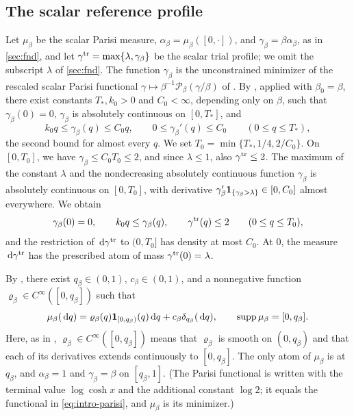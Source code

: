 \subsection{The scalar reference profile}
Let $\mu_\beta$ be the scalar Parisi measure, $\alpha_\beta=\mu_\beta([0,\cdot])$,
and $\gamma_\beta=\beta\alpha_\beta$, as in \cref{sec:fnd}, and let
$\gamma^{\rm tr}=\max\{\lambda,\gamma_\beta\}$ be the scalar trial profile; we
omit the subscript $\lambda$ of \cref{sec:fnd}. The function $\gamma_\beta$ is
the unconstrained minimizer of the rescaled scalar Parisi functional
$\gamma\mapsto\beta^{-1}\mathcal P_\beta(\gamma/\beta)$ of
\cite[Section~7.1]{AL}. By \cite[Lemma~7.2]{AL}, applied with $\beta_0=\beta$,
there exist constants $T_*,k_0>0$ and $C_0<\infty$, depending only on $\beta$,
such that $\gamma_\beta(0)=0$, $\gamma_\beta$ is absolutely continuous on
$[0,T_*]$, and
\[
 k_0q\le\gamma_\beta(q)\le C_0q,\qquad
 0\le\gamma_\beta'(q)\le C_0\qquad(0\le q\le T_*),
\]
the second bound for almost every $q$. We set $T_0=\min\{T_*,1/4,2/C_0\}$.
On $[0,T_0]$, we have $\gamma_\beta\le C_0T_0\le2$, and since $\lambda\le1$,
also $\gamma^{\rm tr}\le2$. The maximum of the constant $\lambda$ and the
nondecreasing absolutely continuous function $\gamma_\beta$ is absolutely
continuous on $[0,T_0]$, with derivative
$\gamma_\beta'\mathbf1_{\{\gamma_\beta>\lambda\}}\in[0,C_0]$ almost everywhere. We
obtain
\begin{equation}\label{eq:lz-gsroot}
 \gamma_\beta(0)=0,\qquad k_0q\le\gamma_\beta(q),\qquad
 \gamma^{\rm tr}(q)\le2\qquad(0\le q\le T_0),
\end{equation}
and the restriction of $\,\mathrm d\gamma^{\rm tr}$ to $(0,T_0]$ has density at most
$C_0$. At $0$, the measure $\,\mathrm d\gamma^{\rm tr}$ has the prescribed atom of
mass $\gamma^{\rm tr}(0)=\lambda$.

By \cite[Theorem~1.1, (1.4) and (1.5)]{Lopatto}, there exist
$q_\beta\in(0,1)$, $c_\beta\in(0,1)$, and a nonnegative function
$\varrho_\beta\in C^\infty([0,q_\beta])$ such that
\begin{equation}\label{eq:loc-scalar-measure}
 \mu_\beta(\,\mathrm d q)=\varrho_\beta(q)\mathbf1_{[0,q_\beta)}(q)\,\mathrm d q
                  +c_\beta\delta_{q_\beta}(\,\mathrm d q),\qquad
 \operatorname{supp}\mu_\beta=[0,q_\beta].
\end{equation}
Here, as in \cite{Lopatto}, $\varrho_\beta\in C^\infty([0,q_\beta])$ means
that $\varrho_\beta$ is smooth on $(0,q_\beta)$ and that each of its
derivatives extends continuously to $[0,q_\beta]$. The only atom of
$\mu_\beta$ is at $q_\beta$, and $\alpha_\beta=1$ and $\gamma_\beta=\beta$ on
$[q_\beta,1]$. (The Parisi functional \cite[(1.3)]{Lopatto} is written with the
terminal value $\log\cosh x$ and the additional constant $\log2$; it equals the
functional in \eqref{eq:intro-parisi}, and $\mu_\beta$ is its minimizer.)

